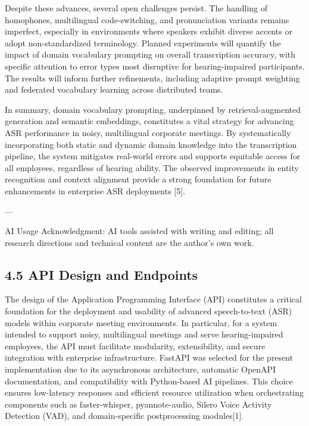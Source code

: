 \documentclass[12pt,a4paper]{article}
\begin{document}
Despite these advances, several open challenges persist. The handling of homophones, multilingual code-switching, and pronunciation variants remains imperfect, especially in environments where speakers exhibit diverse accents or adopt non-standardized terminology. Planned experiments will quantify the impact of domain vocabulary prompting on overall transcription accuracy, with specific attention to error types most disruptive for hearing-impaired participants. The results will inform further refinements, including adaptive prompt weighting and federated vocabulary learning across distributed teams.


In summary, domain vocabulary prompting, underpinned by retrieval-augmented generation and semantic embeddings, constitutes a vital strategy for advancing ASR performance in noisy, multilingual corporate meetings. By systematically incorporating both static and dynamic domain knowledge into the transcription pipeline, the system mitigates real-world errors and supports equitable access for all employees, regardless of hearing ability. The observed improvements in entity recognition and context alignment provide a strong foundation for future enhancements in enterprise ASR deployments [5].


---


AI Usage Acknowledgment: AI tools assisted with writing and editing; all research directions and technical content are the author's own work.


\subsection{4.5 API Design and Endpoints}


The design of the Application Programming Interface (API) constitutes a critical foundation for the deployment and usability of advanced speech-to-text (ASR) models within corporate meeting environments. In particular, for a system intended to support noisy, multilingual meetings and serve hearing-impaired employees, the API must facilitate modularity, extensibility, and secure integration with enterprise infrastructure. FastAPI was selected for the present implementation due to its asynchronous architecture, automatic OpenAPI documentation, and compatibility with Python-based AI pipelines. This choice ensures low-latency responses and efficient resource utilization when orchestrating components such as faster-whisper, pyannote-audio, Silero Voice Activity Detection (VAD), and domain-specific postprocessing modules[1].
\end{document}

